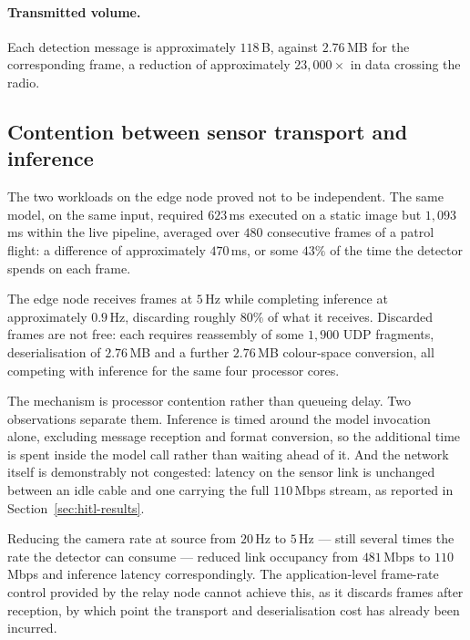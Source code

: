 \paragraph{Transmitted volume.}
Each detection message is approximately \(118\)\,B, against \(2.76\)\,MB for the
corresponding frame, a reduction of approximately \(23{,}000\times\) in data
crossing the radio.

\subsection{Contention between sensor transport and inference}
\label{sec:hitl-contention}

The two workloads on the edge node proved not to be independent. The same model,
on the same input, required \(623\)\,ms executed on a static image but
\(1{,}093\)\,ms within the live pipeline, averaged over \(480\) consecutive
frames of a patrol flight: a difference of approximately \(470\)\,ms, or some
\(43\%\) of the time the detector spends on each frame.

The edge node receives frames at \(5\)\,Hz while completing inference at
approximately \(0.9\)\,Hz, discarding roughly \(80\%\) of what it receives.
Discarded frames are not free: each requires reassembly of some \(1{,}900\) UDP
fragments, deserialisation of \(2.76\)\,MB and a further \(2.76\)\,MB
colour-space conversion, all competing with inference for the same four
processor cores.

The mechanism is processor contention rather than queueing delay. Two
observations separate them. Inference is timed around the model invocation
alone, excluding message reception and format conversion, so the additional
time is spent inside the model call rather than waiting ahead of it. And the
network itself is demonstrably not congested: latency on the sensor link is
unchanged between an idle cable and one carrying the full \(110\)\,Mbps
stream, as reported in Section~\ref{sec:hitl-results}.

Reducing the camera rate at source from \(20\)\,Hz to \(5\)\,Hz --- still
several times the rate the detector can consume --- reduced link occupancy from
\(481\)\,Mbps to \(110\)\,Mbps and inference latency correspondingly. The
application-level frame-rate control provided by the relay node cannot achieve
this, as it discards frames after reception, by which point the transport and
deserialisation cost has already been incurred.

